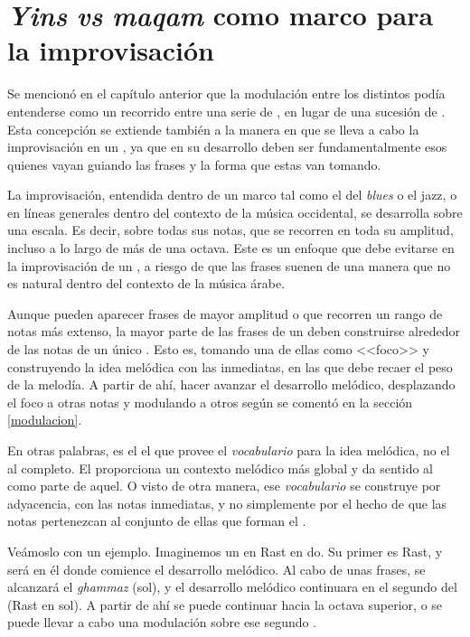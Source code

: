 \section{\emph{Yins} \emph{vs} \emph{maqam} como marco para la improvisación}
\label{yinsvsmaqam}

Se mencionó en el capítulo anterior que la modulación entre los distintos \maqamaat podía entenderse como un recorrido entre una serie de \ashnasb, en lugar de una sucesión de \maqamaatb. Esta concepción se extiende también a la manera en que se lleva a cabo la improvisación en un \taqsimb, ya que en su desarrollo deben ser fundamentalmente esos \ashnas quienes vayan guiando las frases y la forma que estas van tomando.

La improvisación, entendida dentro de un marco tal como el del \emph{blues} o el jazz, o en líneas generales dentro del contexto de la música occidental, se desarrolla sobre una escala. Es decir, sobre todas sus notas, que se recorren en toda su amplitud, incluso a lo largo de más de una octava. Este es un enfoque que debe evitarse en la improvisación de un \taqsimb, a riesgo de que las frases suenen de una manera que no es natural dentro del contexto de la música árabe.

Aunque pueden aparecer frases de mayor amplitud o que recorren un rango de notas más extenso, la mayor parte de las frases de un \taqsim deben construirse alrededor de las notas de un único \yinsb. Esto es, tomando una de ellas como <<foco>> y construyendo la idea melódica con las inmediatas, en las que debe recaer el peso de la melodía. A partir de ahí, hacer avanzar el desarrollo melódico, desplazando el foco a otras notas y modulando a otros \ashnas según se comentó en la sección \ref{modulacion}.

En otras palabras, es el \yins el que provee el \emph{vocabulario} para la idea melódica, no el \maqam al completo. El \maqam proporciona un contexto melódico más global y da sentido al \yins como parte de aquel. O visto de otra manera, ese \emph{vocabulario} se construye por adyacencia, con las notas inmediatas, y no simplemente por el hecho de que las notas pertenezcan al conjunto de ellas que forman el \maqamb.

Veámoslo con un ejemplo. Imaginemos un \taqsim en \maqam Rast en do. Su primer \yins es \yins Rast, y será en él donde comience el desarrollo melódico. Al cabo de unas frases, se alcanzará el \emph{ghammaz} (sol), y el desarrollo melódico continuara en el segundo \yins del \maqam (\yins Rast en sol). A partir de ahí se puede continuar hacia la octava superior, o se puede llevar a cabo una modulación sobre ese segundo \yinsb.

